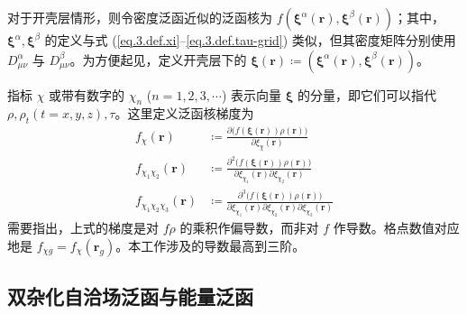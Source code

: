 对于开壳层情形，则令密度泛函近似的泛函核为 $f(\bm{\xi}^\alpha (\bm{r}), \bm{\xi}^\beta (\bm{r}))$；其中，$\bm{\xi}^\alpha, \bm{\xi}^\beta$ 的定义与式 (\ref{eq.3.def.xi}--\ref{eq.3.def.tau-grid}) 类似，但其密度矩阵分别使用 $D_{\mu \nu}^\alpha$ 与 $D_{\mu \nu}^\beta$。为方便起见，定义开壳层下的 $\bm{\xi}(\bm{r}) \coloneq (\bm{\xi}^\alpha (\bm{r}), \bm{\xi}^\beta (\bm{r}))$。

指标 $\chi$ 或带有数字的 $\chi_n$ ($n = 1, 2, 3, \cdots$) 表示向量 $\bm{\xi}$ 的分量，即它们可以指代 $\rho, \rho_t (t = x, y, z), \tau$。这里定义泛函核梯度为
\begin{subequations}
\begin{align}
    \label{eq.3.def.f-chi-1}
    f_{\chi} (\bm{r}) &\coloneq \frac{\partial \big( f (\bm{\xi} (\bm{r})) \rho (\bm{r}) \big)}{\partial \xi_{\chi}(\bm{r})} \\
    \label{eq.3.def.f-chi-2}
    f_{{\chi_1} {\chi_2}} (\bm{r}) &\coloneq \frac{\partial^2 \big( f (\bm{\xi} (\bm{r})) \rho (\bm{r}) \big)}{\partial \xi_{\chi_1}(\bm{r}) \partial \xi_{\chi_2}(\bm{r})} \\
    \label{eq.3.def.f-chi-3}
    f_{{\chi_1} {\chi_2} {\chi_3}} (\bm{r}) &\coloneq \frac{\partial^3 \big( f (\bm{\xi} (\bm{r})) \rho (\bm{r}) \big)}{\partial \xi_{\chi_1}(\bm{r}) \partial \xi_{\chi_2}(\bm{r}) \partial \xi_{\chi_3}(\bm{r})}
\end{align}
\end{subequations}
需要指出，上式的梯度是对 $f \rho$ 的乘积作偏导数，而非对 $f$ 作导数。格点数值对应地是 $f_{\chi g} = f_{\chi} (\bm{r}_g)$。本工作涉及的导数最高到三阶。

\subsection{双杂化自洽场泛函与能量泛函}

